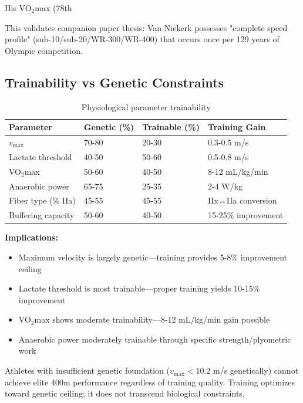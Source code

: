 His VO$_2$max (78th %

This validates companion paper thesis: Van Niekerk possesses "complete speed profile" (sub-10/sub-20/WR-300/WR-400) that occurs once per 129 years of Olympic competition.

\subsection{Trainability vs Genetic Constraints}

\begin{table}[H]
\centering
\caption{Physiological parameter trainability}
\begin{tabular}{@{}llll@{}}
\toprule
\textbf{Parameter} & \textbf{Genetic (\%)} & \textbf{Trainable (\%)} & \textbf{Training Gain} \\
\midrule
$v_{\max}$ & 70-80 & 20-30 & 0.3-0.5 m/s \\
Lactate threshold & 40-50 & 50-60 & 0.5-0.8 m/s \\
VO$_2$max & 50-60 & 40-50 & 8-12 mL/kg/min \\
Anaerobic power & 65-75 & 25-35 & 2-4 W/kg \\
Fiber type (\% IIa) & 45-55 & 45-55 & IIx↔IIa conversion \\
Buffering capacity & 50-60 & 40-50 & 15-25\% improvement \\
\bottomrule
\end{tabular}
\end{table}

\textbf{Implications:}
\begin{itemize}
    \item Maximum velocity is largely genetic—training provides 5-8\% improvement ceiling
    \item Lactate threshold is most trainable—proper training yields 10-15\% improvement
    \item VO$_2$max shows moderate trainability—8-12 mL/kg/min gain possible
    \item Anaerobic power moderately trainable through specific strength/plyometric work
\end{itemize}

Athletes with insufficient genetic foundation ($v_{\max} < 10.2$ m/s genetically) cannot achieve elite 400m performance regardless of training quality. Training optimizes toward genetic ceiling; it does not transcend biological constraints.

